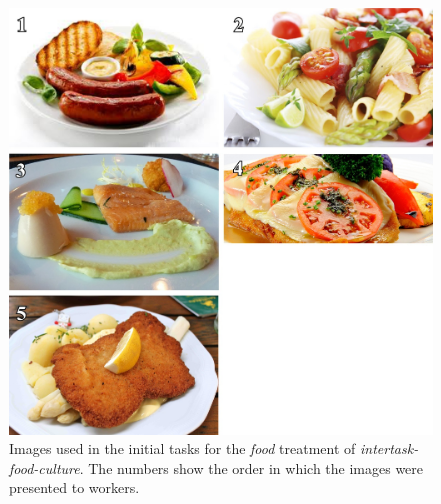 \documentclass[12pt]{article}
\begin{document}
\begin{figure}
	\begin{center}
	\includegraphics{figs/task2-food.jpg}
	\end{center}
	\caption{
		Images used in the initial tasks for the
		\textit{food} treatment of \textit{intertask-food-culture}.  
		The numbers show the order in which the 
		images were presented to workers.
	}
	\label{fig:task2:food}
\end{figure}
\end{document}
